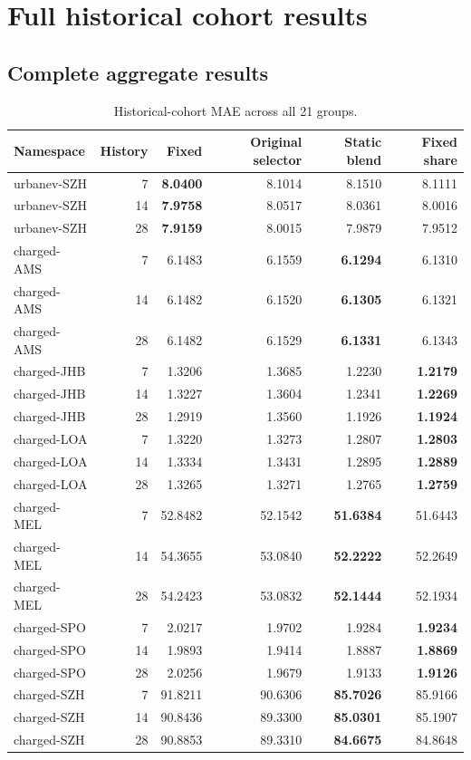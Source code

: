 \documentclass[pdflatex,iicol,sn-mathphys-num]{sn-jnl}
\begin{document}
\section{Full historical cohort results}

\subsection{Complete aggregate results}

\begin{table}[t]
\centering\small
\caption{Historical-cohort MAE across all 21 groups.}\label{tab:4}
\begin{tabular*}{\textwidth}{@{\extracolsep{\fill}}lrrrrr@{}}\toprule
Namespace & History & Fixed & Original selector & Static blend & Fixed share\\\midrule
urbanev-SZH & 7 & \textbf{8.0400} & 8.1014 & 8.1510 & 8.1111\\
urbanev-SZH & 14 & \textbf{7.9758} & 8.0517 & 8.0361 & 8.0016\\
urbanev-SZH & 28 & \textbf{7.9159} & 8.0015 & 7.9879 & 7.9512\\
charged-AMS & 7 & 6.1483 & 6.1559 & \textbf{6.1294} & 6.1310\\
charged-AMS & 14 & 6.1482 & 6.1520 & \textbf{6.1305} & 6.1321\\
charged-AMS & 28 & 6.1482 & 6.1529 & \textbf{6.1331} & 6.1343\\
charged-JHB & 7 & 1.3206 & 1.3685 & 1.2230 & \textbf{1.2179}\\
charged-JHB & 14 & 1.3227 & 1.3604 & 1.2341 & \textbf{1.2269}\\
charged-JHB & 28 & 1.2919 & 1.3560 & 1.1926 & \textbf{1.1924}\\
charged-LOA & 7 & 1.3220 & 1.3273 & 1.2807 & \textbf{1.2803}\\
charged-LOA & 14 & 1.3334 & 1.3431 & 1.2895 & \textbf{1.2889}\\
charged-LOA & 28 & 1.3265 & 1.3271 & 1.2765 & \textbf{1.2759}\\
charged-MEL & 7 & 52.8482 & 52.1542 & \textbf{51.6384} & 51.6443\\
charged-MEL & 14 & 54.3655 & 53.0840 & \textbf{52.2222} & 52.2649\\
charged-MEL & 28 & 54.2423 & 53.0832 & \textbf{52.1444} & 52.1934\\
charged-SPO & 7 & 2.0217 & 1.9702 & 1.9284 & \textbf{1.9234}\\
charged-SPO & 14 & 1.9893 & 1.9414 & 1.8887 & \textbf{1.8869}\\
charged-SPO & 28 & 2.0256 & 1.9679 & 1.9133 & \textbf{1.9126}\\
charged-SZH & 7 & 91.8211 & 90.6306 & \textbf{85.7026} & 85.9166\\
charged-SZH & 14 & 90.8436 & 89.3300 & \textbf{85.0301} & 85.1907\\
charged-SZH & 28 & 90.8853 & 89.3310 & \textbf{84.6675} & 84.8648\\
\bottomrule\end{tabular*}
\end{table}
\end{document}
